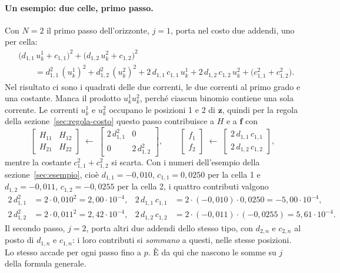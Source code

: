 \documentclass[11pt,a4paper]{article}
\newcommand{\vett}[1]{\boldsymbol{#1}}      %
\begin{document}
\paragraph{Un esempio: due celle, primo passo.} Con $N = 2$ il primo passo
dell'orizzonte, $j = 1$, porta nel costo due addendi, uno per cella:
\begin{align*}
  & \bigl(d_{1,1}\,u^1_k + c_{1,1}\bigr)^2 + \bigl(d_{1,2}\,u^2_k + c_{1,2}\bigr)^2 \\[2pt]
  & \qquad = d_{1,1}^2\,(u^1_k)^2 + d_{1,2}^2\,(u^2_k)^2
      + 2\,d_{1,1}\,c_{1,1}\,u^1_k + 2\,d_{1,2}\,c_{1,2}\,u^2_k
      + \bigl(c_{1,1}^2 + c_{1,2}^2\bigr) .
\end{align*}
Nel risultato ci sono i quadrati delle due correnti, le due correnti al primo
grado e una costante. Manca il prodotto $u^1_k u^2_k$, perché ciascun binomio
contiene una sola corrente. Le correnti $u^1_k$ e $u^2_k$ occupano le posizioni 1 e
2 di $\vett{z}$, quindi per la regola della sezione~\ref{sec:regola-costo} questo
passo contribuisce a $H$ e a $\vett{f}$ con
\[
  \begin{bmatrix} H_{11} & H_{12} \\ H_{21} & H_{22} \end{bmatrix}
  \;\leftarrow\;
  \begin{bmatrix} 2\,d_{1,1}^2 & 0 \\ 0 & 2\,d_{1,2}^2 \end{bmatrix} ,
  \qquad
  \begin{bmatrix} f_1 \\ f_2 \end{bmatrix}
  \;\leftarrow\;
  \begin{bmatrix} 2\,d_{1,1}\,c_{1,1} \\ 2\,d_{1,2}\,c_{1,2} \end{bmatrix} ,
\]
mentre la costante $c_{1,1}^2 + c_{1,2}^2$ si scarta. Con i numeri
dell'esempio della sezione~\ref{sec:esempio}, cioè $d_{1,1} = -0{,}010$,
$c_{1,1} = 0{,}0250$ per la cella 1 e $d_{1,2} = -0{,}011$,
$c_{1,2} = -0{,}0255$ per la cella 2, i quattro contributi valgono
\begin{align*}
  2\,d_{1,1}^2 &= 2 \cdot 0{,}010^2 = 2{,}00 \cdot 10^{-4} ,
  & 2\,d_{1,1}\,c_{1,1} &= 2 \cdot (-0{,}010) \cdot 0{,}0250 = -5{,}00 \cdot 10^{-4} , \\
  2\,d_{1,2}^2 &= 2 \cdot 0{,}011^2 = 2{,}42 \cdot 10^{-4} ,
  & 2\,d_{1,2}\,c_{1,2} &= 2 \cdot (-0{,}011) \cdot (-0{,}0255) = 5{,}61 \cdot 10^{-4} .
\end{align*}
Il secondo passo, $j = 2$, porta altri due addendi dello stesso tipo, con
$d_{2,n}$ e $c_{2,n}$ al posto di $d_{1,n}$ e $c_{1,n}$: i loro contributi si
\emph{sommano} a questi, nelle stesse posizioni. Lo stesso accade per ogni
passo fino a $p$. È da qui che nascono le somme su $j$ della formula generale.
\end{document}

